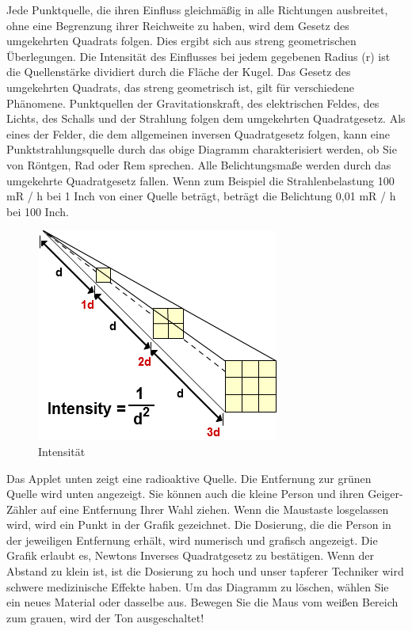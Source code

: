 {{Jede Punktquelle, die ihren Einfluss gleichmäßig in alle Richtungen ausbreitet, ohne eine Begrenzung ihrer Reichweite zu haben, wird dem Gesetz des umgekehrten Quadrats folgen. Dies ergibt sich aus streng geometrischen Überlegungen. Die Intensität des Einflusses bei jedem gegebenen Radius (r) ist die Quellenstärke dividiert durch die Fläche der Kugel. Das Gesetz des umgekehrten Quadrats, das streng geometrisch ist, gilt für verschiedene Phänomene. Punktquellen der Gravitationskraft, des elektrischen Feldes, des Lichts, des Schalls und der Strahlung folgen dem umgekehrten Quadratgesetz.
Als eines der Felder, die dem allgemeinen inversen Quadratgesetz folgen, kann eine Punktstrahlungsquelle durch das obige Diagramm charakterisiert werden, ob Sie von Röntgen, Rad oder Rem sprechen. Alle Belichtungsmaße werden durch das umgekehrte Quadratgesetz fallen.
Wenn zum Beispiel die Strahlenbelastung 100 mR / h bei 1 Inch von einer Quelle beträgt, beträgt die Belichtung 0,01 mR / h bei 100 Inch.
\begin{figure}[htb]
  \centering  
  \includegraphics[scale=0.5]{img/Intensitaet.png}
  \caption{Intensität}
  \label{fig:Intensität}
\end{figure}
Das Applet unten zeigt eine radioaktive Quelle. Die Entfernung zur grünen Quelle wird unten angezeigt. Sie können auch die kleine Person und ihren Geiger-Zähler auf eine Entfernung Ihrer Wahl ziehen. Wenn die Maustaste losgelassen wird, wird ein Punkt in der Grafik gezeichnet. Die Dosierung, die die Person in der jeweiligen Entfernung erhält, wird numerisch und grafisch angezeigt. Die Grafik erlaubt es, Newtons Inverses Quadratgesetz zu bestätigen.
Wenn der Abstand zu klein ist, ist die Dosierung zu hoch und unser tapferer Techniker wird schwere medizinische Effekte haben. Um das Diagramm zu löschen, wählen Sie ein neues Material oder dasselbe aus. Bewegen Sie die Maus vom weißen Bereich zum grauen, wird der Ton ausgeschaltet!
}}
